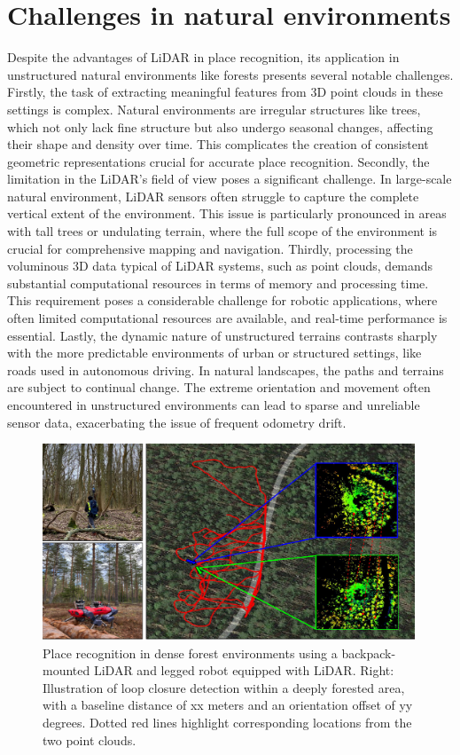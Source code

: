 \section{Challenges in natural environments}
Despite the advantages of LiDAR in place recognition, its application in unstructured natural environments like forests presents several notable challenges.
Firstly, the task of extracting meaningful features from 3D point clouds in these settings is complex. 
Natural environments are irregular structures like trees, which not only lack fine structure but also undergo seasonal changes, affecting their shape and density over time. 
This complicates the creation of consistent geometric representations crucial for accurate place recognition.
Secondly, the limitation in the LiDAR's field of view poses a significant challenge. In large-scale natural environment, LiDAR sensors often struggle to capture the complete vertical extent of the environment. 
This issue is particularly pronounced in areas with tall trees or undulating terrain, where the full scope of the environment is crucial for comprehensive mapping and navigation.
Thirdly, processing the voluminous 3D data typical of LiDAR systems, such as point clouds, demands substantial computational resources in terms of memory and processing time. 
This requirement poses a considerable challenge for robotic applications, where often limited computational resources are available, and real-time performance is essential.
Lastly, the dynamic nature of unstructured terrains contrasts sharply with the more predictable environments of urban or structured settings, like roads used in autonomous driving. 
In natural landscapes, the paths and terrains are subject to continual change. 
The extreme orientation and movement often encountered in unstructured environments can lead to sparse and unreliable sensor data, exacerbating the issue of frequent odometry drift.

\begin{figure}[h]
\centering  
\includegraphics[width=0.99\textwidth]{pics/intro_motivation_fig_189_100}    
\caption{Place recognition in dense forest environments using a backpack-mounted LiDAR and legged robot equipped with LiDAR.
Right: Illustration of loop closure detection within a deeply forested area, with a baseline distance of xx meters and an orientation offset of yy degrees. Dotted red lines highlight corresponding locations from the two point clouds.}
\label{fig:intro_motivation}
\end{figure}

